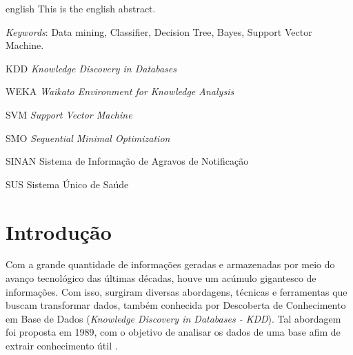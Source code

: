 \documentclass[
	12pt,				%
	openright,			%
	oneside,	
	a4paper,				%
	english,				%
	brazil				%
]{abntex2/abntex2} %
\begin{document}

\begin{resumo}[Abstract]
 \begin{otherlanguage*}{english}
   This is the english abstract.

   \vspace{\onelineskip}
 
   \noindent 
   \textit{Keywords}: Data mining, Classifier, Decision Tree, Bayes, Support Vector Machine.
 \end{otherlanguage*}
\end{resumo}

\listoffigures*
\cleardoublepage

\listoftables*
\cleardoublepage

\begin{siglas}
  \item[KDD] \textit{Knowledge Discovery in Databases}
  \item[WEKA] \textit{Waikato Environment for Knowledge Analysis}
  \item[SVM] \textit{Support Vector Machine}
  \item[SMO] \textit{Sequential Minimal Optimization}
  \item[SINAN] Sistema de Informação de Agravos de Notificação
  \item[SUS] Sistema Único de Saúde
\end{siglas}




\tableofcontents*
\cleardoublepage

\textual

\chapter{Introdução}

	Com a grande quantidade de informações geradas e armazenadas por meio do avanço tecnológico das últimas décadas, houve um acúmulo gigantesco de informações. Com isso, surgiram diversas abordagens, técnicas e ferramentas que buscam transformar dados, também conhecida por Descoberta de Conhecimento em Base de Dados (\textit{Knowledge Discovery in Databases - KDD}). Tal abordagem foi proposta em 1989, com o objetivo de analisar os dados de uma base afim de extrair conhecimento útil \cite{fayyad:1996}.	
	
\end{document}
